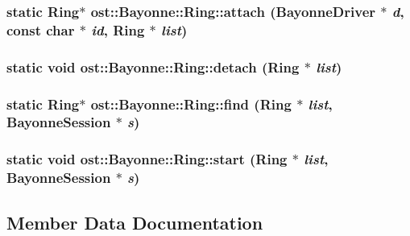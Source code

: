 \subsubsection[{attach}]{\setlength{\rightskip}{0pt plus 5cm}static {\bf Ring}$\ast$ ost::Bayonne::Ring::attach ({\bf BayonneDriver} $\ast$ {\em d}, \/  const char $\ast$ {\em id}, \/  {\bf Ring} $\ast$ {\em list})\hspace{0.3cm}{\ttfamily  [static]}}\label{classost_1_1_bayonne_1_1_ring_a712bd8a49315250c6e22992a33a8b16c}
\subsubsection[{detach}]{\setlength{\rightskip}{0pt plus 5cm}static void ost::Bayonne::Ring::detach ({\bf Ring} $\ast$ {\em list})\hspace{0.3cm}{\ttfamily  [static]}}\label{classost_1_1_bayonne_1_1_ring_afd82b7fc46afa17130e08769c5e832ad}
\subsubsection[{find}]{\setlength{\rightskip}{0pt plus 5cm}static {\bf Ring}$\ast$ ost::Bayonne::Ring::find ({\bf Ring} $\ast$ {\em list}, \/  {\bf BayonneSession} $\ast$ {\em s})\hspace{0.3cm}{\ttfamily  [static]}}\label{classost_1_1_bayonne_1_1_ring_a762444c59ebd598d56ac616aee49d43b}
\subsubsection[{start}]{\setlength{\rightskip}{0pt plus 5cm}static void ost::Bayonne::Ring::start ({\bf Ring} $\ast$ {\em list}, \/  {\bf BayonneSession} $\ast$ {\em s})\hspace{0.3cm}{\ttfamily  [static]}}\label{classost_1_1_bayonne_1_1_ring_a6b0b758000d1de99eeee4d864278c25a}


\subsection{Member Data Documentation}
